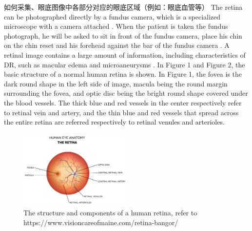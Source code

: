 \documentclass{ijisa}
\begin{document}
如何采集、眼底图像中各部分对应的眼底区域（例如：眼底血管等）
The retina can be photographed directly by a fundus camera, which is a specialized microscope with a camera attached \cite{shankle2004ophthalmic}.
When the patient is taken the fundus photograph, he will be asked to sit in front of the fundus camera, place his chin on the chin reset and his forehead against the bar of the fundus camera \cite{shankle2004ophthalmic}.
A retinal image contains a large amount of information, including characteristics of DR, such as macular edema and microaneurysms \cite{shankle2004ophthalmic}. In Figure 1 and Figure 2, the basic structure of a normal human retina is shown. In Figure 1, the fovea is the dark round shape in the left side of image, macula being the round margin surrounding the fovea, and optic disc being the bright round shape covered under the blood vessels. The thick blue and red vessels in the center respectively refer to retinal vein and artery, and the thin blue and red vessels that spread across the entire retina are referred respectively to retinal venules and arterioles. 
\begin{figure}[h]
\centering
\includegraphics[width=0.5\textwidth]{figures/the_retina.jpg}
\caption{The structure and components of a human retina, refer to
https://www.visioncareofmaine.com/retina-bangor/}
\end{figure}
\end{document}
